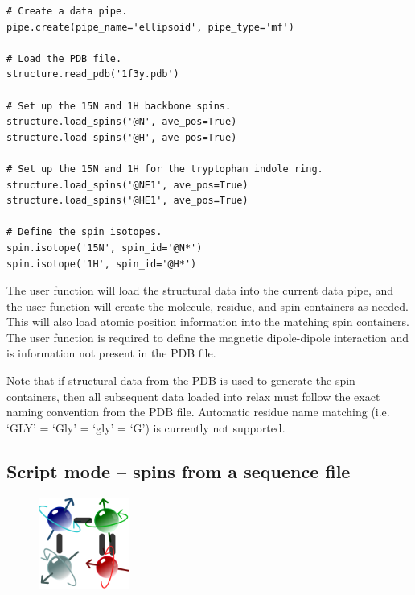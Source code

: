 \begin{lstlisting}
# Create a data pipe.
pipe.create(pipe_name='ellipsoid', pipe_type='mf')

# Load the PDB file.
structure.read_pdb('1f3y.pdb')

# Set up the 15N and 1H backbone spins.
structure.load_spins('@N', ave_pos=True)
structure.load_spins('@H', ave_pos=True)

# Set up the 15N and 1H for the tryptophan indole ring.
structure.load_spins('@NE1', ave_pos=True)
structure.load_spins('@HE1', ave_pos=True)

# Define the spin isotopes.
spin.isotope('15N', spin_id='@N*')
spin.isotope('1H', spin_id='@H*')
\end{lstlisting}

The  user function will load the structural data into the current data pipe, and the  user function will create the molecule, residue, and spin containers as needed.
This will also load atomic position information into the matching spin containers.
The  user function is required to define the magnetic dipole-dipole interaction and is information not present in the PDB file.

Note that if structural data from the PDB is used to generate the spin containers, then all subsequent data loaded into relax must follow the exact naming convention from the PDB file.
Automatic residue name matching (i.e. `GLY' = `Gly' = `gly' = `G') is currently not supported.




\subsection{Script mode -- spins from a sequence file} \label{sect: script - sequence file}

\begin{figure}[h]
  \includegraphics[width=3cm, bb=0 0 1701 1701]{graphics/misc/sequence_600x600}
\end{figure}

